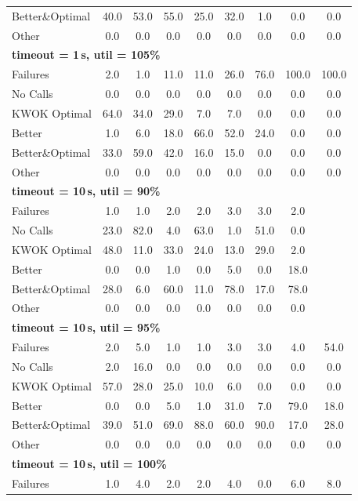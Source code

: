 \begin{tabular}{l cccccccc}
Better\&Optimal & 40.0 & 53.0 & 55.0 & 25.0 & 32.0 & 1.0 & 0.0 & 0.0 \\
Other & 0.0 & 0.0 & 0.0 & 0.0 & 0.0 & 0.0 & 0.0 & 0.0 \\
\midrule
\multicolumn{9}{l}{\textbf{timeout = 1\,s, util = 105\%}} \\
\midrule
Failures & 2.0 & 1.0 & 11.0 & 11.0 & 26.0 & 76.0 & 100.0 & 100.0 \\
No Calls & 0.0 & 0.0 & 0.0 & 0.0 & 0.0 & 0.0 & 0.0 & 0.0 \\
KWOK Optimal & 64.0 & 34.0 & 29.0 & 7.0 & 7.0 & 0.0 & 0.0 & 0.0 \\
Better & 1.0 & 6.0 & 18.0 & 66.0 & 52.0 & 24.0 & 0.0 & 0.0 \\
Better\&Optimal & 33.0 & 59.0 & 42.0 & 16.0 & 15.0 & 0.0 & 0.0 & 0.0 \\
Other & 0.0 & 0.0 & 0.0 & 0.0 & 0.0 & 0.0 & 0.0 & 0.0 \\
\midrule
\multicolumn{9}{l}{\textbf{timeout = 10\,s, util = 90\%}} \\
\midrule
Failures & 1.0 & 1.0 & 2.0 & 2.0 & 3.0 & 3.0 & 2.0 & \text{--} \\
No Calls & 23.0 & 82.0 & 4.0 & 63.0 & 1.0 & 51.0 & 0.0 & \text{--} \\
KWOK Optimal & 48.0 & 11.0 & 33.0 & 24.0 & 13.0 & 29.0 & 2.0 & \text{--} \\
Better & 0.0 & 0.0 & 1.0 & 0.0 & 5.0 & 0.0 & 18.0 & \text{--} \\
Better\&Optimal & 28.0 & 6.0 & 60.0 & 11.0 & 78.0 & 17.0 & 78.0 & \text{--} \\
Other & 0.0 & 0.0 & 0.0 & 0.0 & 0.0 & 0.0 & 0.0 & \text{--} \\
\midrule
\multicolumn{9}{l}{\textbf{timeout = 10\,s, util = 95\%}} \\
\midrule
Failures & 2.0 & 5.0 & 1.0 & 1.0 & 3.0 & 3.0 & 4.0 & 54.0 \\
No Calls & 2.0 & 16.0 & 0.0 & 0.0 & 0.0 & 0.0 & 0.0 & 0.0 \\
KWOK Optimal & 57.0 & 28.0 & 25.0 & 10.0 & 6.0 & 0.0 & 0.0 & 0.0 \\
Better & 0.0 & 0.0 & 5.0 & 1.0 & 31.0 & 7.0 & 79.0 & 18.0 \\
Better\&Optimal & 39.0 & 51.0 & 69.0 & 88.0 & 60.0 & 90.0 & 17.0 & 28.0 \\
Other & 0.0 & 0.0 & 0.0 & 0.0 & 0.0 & 0.0 & 0.0 & 0.0 \\
\midrule
\multicolumn{9}{l}{\textbf{timeout = 10\,s, util = 100\%}} \\
\midrule
Failures & 1.0 & 4.0 & 2.0 & 2.0 & 4.0 & 0.0 & 6.0 & 8.0 \\

\end{tabular}
